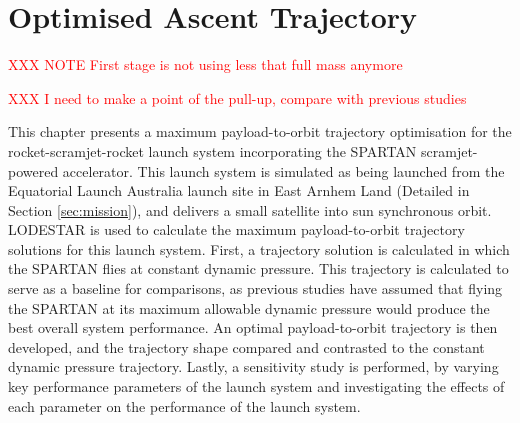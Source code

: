 
\cleardoublepage
\chapter{Optimised Ascent Trajectory}\label{chapter:Ascent}

\textcolor{red}{XXX NOTE First stage is not using less that full mass anymore}

\textcolor{red}{XXX I need to make a point of the pull-up, compare with previous studies}
	
This chapter presents a maximum payload-to-orbit trajectory optimisation for the rocket-scramjet-rocket launch system incorporating the SPARTAN scramjet-powered accelerator. 
This launch system is simulated as being launched from the Equatorial Launch Australia launch site in East Arnhem Land (Detailed in Section \ref{sec:mission}), and delivers a small satellite into sun synchronous orbit. LODESTAR is used to calculate the maximum payload-to-orbit trajectory solutions for this launch system.
First, a trajectory solution is calculated in which the SPARTAN flies at constant dynamic pressure. This trajectory is calculated to serve as a baseline for comparisons, as previous studies have assumed that flying the SPARTAN at its maximum allowable dynamic pressure would produce the best overall system performance\cite{Preller2017b}. An optimal payload-to-orbit trajectory is then developed, and the trajectory shape compared and contrasted to the constant dynamic pressure trajectory.
Lastly, a sensitivity study is performed, by varying key performance parameters of the launch system and investigating the effects of each parameter on the performance of the launch system. 


